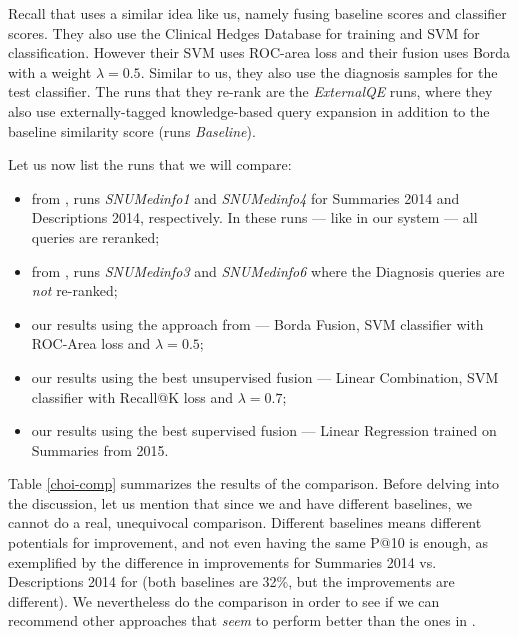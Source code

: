 Recall that \cite{choi} uses a similar idea like us, namely fusing baseline scores and
classifier scores. They also use the Clinical Hedges Database for training and SVM for classification.
However their SVM uses ROC-area loss and their fusion uses Borda with a weight $\lambda=0.5$.
Similar to us, they also use the diagnosis samples for the test classifier.
The runs that they re-rank are the \emph{ExternalQE} runs, where 
they also use externally-tagged knowledge-based query expansion in addition to the baseline similarity score
(runs \emph{Baseline}).

Let us now list the runs that we will compare:
\begin{itemize}
 \item from \cite{choi}, runs \emph{SNUMedinfo1} and \emph{SNUMedinfo4} for Summaries 2014 and Descriptions 2014, respectively.
  In these runs --- like in our system --- all queries are reranked;
 \item from \cite{choi}, runs \emph{SNUMedinfo3} and \emph{SNUMedinfo6} where the Diagnosis queries are \emph{not} re-ranked;
 \item our results using the approach from \cite{choi} --- Borda Fusion, SVM classifier with ROC-Area loss and $\lambda=0.5$;
 \item our results using the best unsupervised fusion --- Linear Combination, SVM classifier with Recall@K loss and $\lambda=0.7$;
 \item our results using the best supervised fusion --- Linear Regression trained on Summaries from 2015.
\end{itemize}

Table \ref{choi-comp} summarizes the results of the comparison.
Before delving into the discussion, let us mention that since we and \cite{choi} have different baselines, 
we cannot do a real, unequivocal comparison. Different baselines means different potentials for improvement, and
not even having the same P@10 is enough, as exemplified by the difference in improvements for Summaries
2014 vs. Descriptions 2014 for \cite{choi} (both baselines are 32\%, but the improvements are different).
We nevertheless do the comparison in order to see if we can recommend other approaches that \emph{seem}
to perform better than the ones in \cite{choi}.

